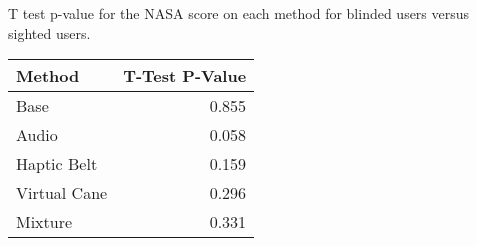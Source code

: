 
\centering
\caption{T test p-value for the NASA score on each method for blinded users versus sighted users.}
\label{tab:ttest_nasa_score}
\begin{tabular}{lr}
\toprule
      Method &  T-Test P-Value \\
\midrule
        Base &           0.855 \\
       Audio &           0.058 \\
 Haptic Belt &           0.159 \\
Virtual Cane &           0.296 \\
     Mixture &           0.331 \\
\bottomrule
\end{tabular}
